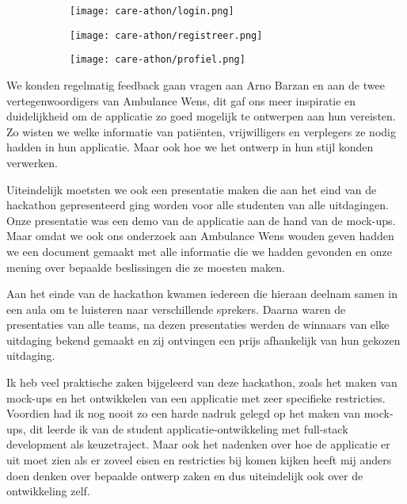 \begin{figure}[!h]
  \centering
  \begin{subfigure}[h]{0.3\textwidth}
    \centering
    \texttt{[image: care-athon/login.png]}
  \end{subfigure}
  \begin{subfigure}[h]{0.3\textwidth}
    \centering
    \texttt{[image: care-athon/registreer.png]}
  \end{subfigure}
  \begin{subfigure}[h]{0.3\textwidth}
    \centering
    \texttt{[image: care-athon/profiel.png]}
  \end{subfigure}
\end{figure}

We konden regelmatig feedback gaan vragen aan Arno Barzan en aan de twee vertegenwoordigers van Ambulance Wens, dit gaf ons meer inspiratie en duidelijkheid om de applicatie zo goed mogelijk te ontwerpen aan hun vereisten. Zo wisten we welke informatie van pati\"enten, vrijwilligers en verplegers ze nodig hadden in hun applicatie. Maar ook hoe we het ontwerp in hun stijl konden verwerken.

Uiteindelijk moetsten we ook een presentatie maken die aan het eind van de hackathon gepresenteerd ging worden voor alle studenten van alle uitdagingen. Onze presentatie was een demo van de applicatie aan de hand van de mock\hyp{}ups. Maar omdat we ook ons onderzoek aan Ambulance Wens wouden geven hadden we een document gemaakt met alle informatie die we hadden gevonden en onze mening over bepaalde beslissingen die ze moesten maken.

Aan het einde van de hackathon kwamen iedereen die hieraan deelnam samen in een aula om te luisteren naar verschillende sprekers. Daarna waren de presentaties van alle teams, na dezen presentaties werden de winnaars van elke uitdaging bekend gemaakt en zij ontvingen een prijs afhankelijk van hun gekozen uitdaging.

Ik heb veel praktische zaken bijgeleerd van deze hackathon, zoals het maken van mock\hyp{}ups en het ontwikkelen van een applicatie met zeer specifieke restricties. Voordien had ik nog nooit zo een harde nadruk gelegd op het maken van mock\hyp{}ups, dit leerde ik van de student applicatie\hyp{}ontwikkeling met full\hyp{}stack development als keuzetraject. Maar ook het nadenken over hoe de applicatie er uit moet zien als er zoveel eisen en restricties bij komen kijken heeft mij anders doen denken over bepaalde ontwerp zaken en dus uiteindelijk ook over de ontwikkeling zelf.

